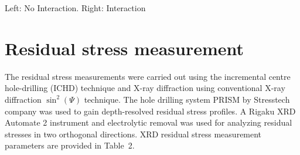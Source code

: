 \qquad %
\caption{Left: No Interaction. Right: Interaction} \label{fig:M} 


    \section*{Residual stress measurement}
    The residual stress measurements were carried out using the incremental centre hole-drilling (ICHD) technique and X-ray diffraction using conventional X-ray diffraction \(\sin ^2(\Psi )\) technique. The hole drilling system PRISM by Stresstech company was used to gain depth-resolved residual stress profiles. A Rigaku XRD Automate 2 instrument and electrolytic removal was used for analyzing residual stresses in two orthogonal directions. XRD residual stress measurement parameters are provided in Table~2. 

